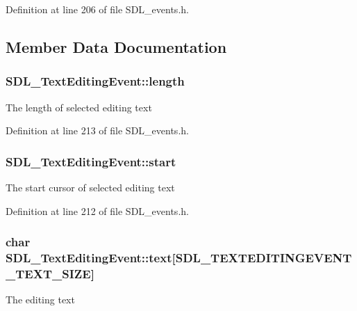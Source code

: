 Definition at line 206 of file S\-D\-L\-\_\-events.\-h.



\subsection{Member Data Documentation}
\hypertarget{struct_s_d_l___text_editing_event_adca95505c0bf212834930df58f6d1aa5}{
\subsubsection[{length}]{ S\-D\-L\-\_\-\-Text\-Editing\-Event\-::length}}\label{struct_s_d_l___text_editing_event_adca95505c0bf212834930df58f6d1aa5}
The length of selected editing text 

Definition at line 213 of file S\-D\-L\-\_\-events.\-h.

\hypertarget{struct_s_d_l___text_editing_event_ac6c6a00835d92b12c0ba5b78b5ad676d}{
\subsubsection[{start}]{ S\-D\-L\-\_\-\-Text\-Editing\-Event\-::start}}\label{struct_s_d_l___text_editing_event_ac6c6a00835d92b12c0ba5b78b5ad676d}
The start cursor of selected editing text 

Definition at line 212 of file S\-D\-L\-\_\-events.\-h.

\hypertarget{struct_s_d_l___text_editing_event_a29848c2e7819ea98ae8fb08543e6d420}{
\subsubsection[{text}]{\setlength{\rightskip}{0pt plus 5cm}char S\-D\-L\-\_\-\-Text\-Editing\-Event\-::text\mbox{[}{\bf S\-D\-L\-\_\-\-T\-E\-X\-T\-E\-D\-I\-T\-I\-N\-G\-E\-V\-E\-N\-T\-\_\-\-T\-E\-X\-T\-\_\-\-S\-I\-Z\-E}\mbox{]}}}\label{struct_s_d_l___text_editing_event_a29848c2e7819ea98ae8fb08543e6d420}
The editing text 

